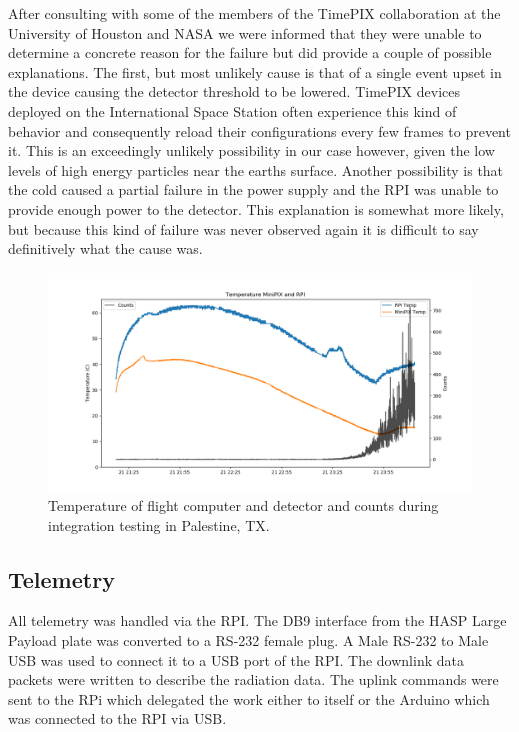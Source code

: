 After consulting with some of the members of the TimePIX collaboration at the University of Houston and NASA we were informed that they were unable to determine a concrete reason for the failure but did provide a couple of possible explanations. The first, but most unlikely cause is that of a single event upset in the device causing the detector threshold to be lowered. TimePIX devices deployed on the International Space Station often experience this kind of behavior and consequently reload their configurations every few frames to prevent it. This is an exceedingly unlikely possibility in our case however, given the low levels of high energy particles near the earths surface. Another possibility is that the cold caused a partial failure in the power supply and the RPI was unable to provide enough power to the detector. This explanation is somewhat more likely, but because this kind of failure was never observed again it is difficult to say definitively what the cause was.
%
\begin{figure}[H]
	\begin{center}
	\includegraphics[width=\textwidth]{figures/tempsandcountsvtime.png}
	\caption{Temperature of flight computer and detector and counts during integration testing in Palestine, TX.}
	\label{fig:integrationtemps}
	\end{center}
\end{figure}
%
\subsection{Telemetry}
\label{sec:Telemetry}

All telemetry was handled via the RPI. The DB9 interface from the HASP Large Payload plate was converted to a 
RS-232 female plug. A Male RS-232 to Male USB was used to connect it to a USB port of the RPI. 
The downlink data packets were written to describe the radiation data. 
The uplink commands were sent to the RPi which delegated the work either to itself or the Arduino which 
was connected to the RPI via USB.

